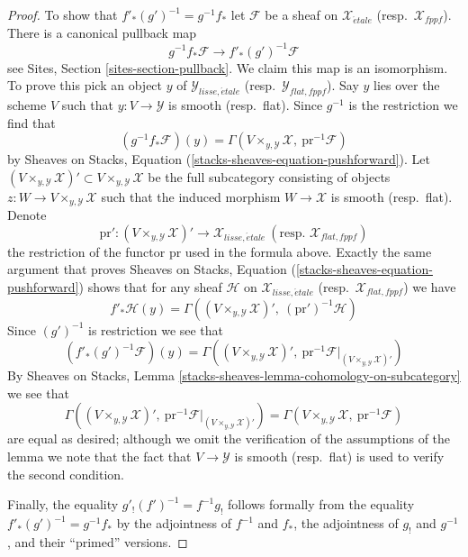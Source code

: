 \begin{proof}
\medskip\noindent
To show that $f'_*(g')^{-1} = g^{-1}f_*$ let $\mathcal{F}$ be a sheaf
on $\mathcal{X}_{\acute{e}tale}$ (resp.\ $\mathcal{X}_{fppf}$).
There is a canonical pullback map
$$
g^{-1}f_*\mathcal{F} \longrightarrow f'_*(g')^{-1}\mathcal{F}
$$
see Sites, Section \ref{sites-section-pullback}.
We claim this map is an isomorphism.
To prove this pick an object $y$ of $\mathcal{Y}_{lisse,\acute{e}tale}$
(resp.\ $\mathcal{Y}_{flat,fppf}$). Say $y$ lies over the scheme $V$
such that $y : V \to \mathcal{Y}$ is smooth (resp.\ flat). Since
$g^{-1}$ is the restriction we find that
$$
\left(g^{-1}f_*\mathcal{F}\right)(y) =
\Gamma(V \times_{y, \mathcal{Y}} \mathcal{X},\ \text{pr}^{-1}\mathcal{F})
$$
by Sheaves on Stacks, Equation (\ref{stacks-sheaves-equation-pushforward}).
Let
$(V \times_{y, \mathcal{Y}} \mathcal{X})' \subset
V \times_{y, \mathcal{Y}} \mathcal{X}$
be the full subcategory consisting of objects
$z : W \to V \times_{y, \mathcal{Y}} \mathcal{X}$ such that the induced
morphism $W \to \mathcal{X}$ is smooth (resp.\ flat). Denote
$$
\text{pr}' :
(V \times_{y, \mathcal{Y}} \mathcal{X})'
\longrightarrow
\mathcal{X}_{lisse,\acute{e}tale}
\ (\text{resp. }\mathcal{X}_{flat,fppf})
$$
the restriction of the functor $\text{pr}$ used in the formula above.
Exactly the same argument that proves
Sheaves on Stacks, Equation (\ref{stacks-sheaves-equation-pushforward})
shows that for any sheaf $\mathcal{H}$ on $\mathcal{X}_{lisse,\acute{e}tale}$
(resp.\ $\mathcal{X}_{flat,fppf}$) we have
\begin{equation}
\label{equation-pushforward-lisse-etale}
f'_*\mathcal{H}(y) =
\Gamma((V \times_{y, \mathcal{Y}} \mathcal{X})',
\ (\text{pr}')^{-1}\mathcal{H})
\end{equation}
Since $(g')^{-1}$ is restriction we see that
$$
\left(f'_*(g')^{-1}\mathcal{F}\right)(y) =
\Gamma((V \times_{y, \mathcal{Y}} \mathcal{X})',
\ \text{pr}^{-1}\mathcal{F}|_{(V \times_{y, \mathcal{Y}} \mathcal{X})'})
$$
By
Sheaves on Stacks, Lemma \ref{stacks-sheaves-lemma-cohomology-on-subcategory}
we see that
$$
\Gamma((V \times_{y, \mathcal{Y}} \mathcal{X})',
\ \text{pr}^{-1}\mathcal{F}|_{(V \times_{y, \mathcal{Y}} \mathcal{X})'})
=
\Gamma(V \times_{y, \mathcal{Y}} \mathcal{X},\ \text{pr}^{-1}\mathcal{F})
$$
are equal as desired; although we omit the verification of the assumptions
of the lemma we note that the fact that $V \to \mathcal{Y}$ is smooth
(resp.\ flat) is used to verify the second condition.

\medskip\noindent
Finally, the equality $g'_!(f')^{-1} = f^{-1}g_!$ follows formally from
the equality $f'_*(g')^{-1} = g^{-1}f_*$ by the adjointness of
$f^{-1}$ and $f_*$, the adjointness of $g_!$ and $g^{-1}$, and their
``primed'' versions.
\end{proof}


